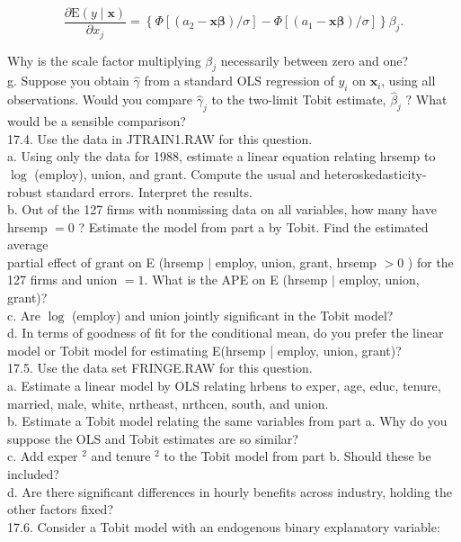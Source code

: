 \documentclass[10pt]{article}
\begin{document}
$$
\frac{\partial \mathrm{E}(y \mid \mathbf{x})}{\partial x_{j}}=\left\{\Phi\left[\left(a_{2}-\mathbf{x} \boldsymbol{\beta}\right) / \sigma\right]-\Phi\left[\left(a_{1}-\mathbf{x} \boldsymbol{\beta}\right) / \sigma\right]\right\} \beta_{j} .
$$

Why is the scale factor multiplying $\beta_{j}$ necessarily between zero and one?\\
g. Suppose you obtain $\hat{\gamma}$ from a standard OLS regression of $y_{i}$ on $\mathbf{x}_{i}$, using all observations. Would you compare $\hat{\gamma}_{j}$ to the two-limit Tobit estimate, $\hat{\beta}_{j}$ ? What would be a sensible comparison?\\
17.4. Use the data in JTRAIN1.RAW for this question.\\
a. Using only the data for 1988, estimate a linear equation relating hrsemp to $\log$ (employ), union, and grant. Compute the usual and heteroskedasticity-robust standard errors. Interpret the results.\\
b. Out of the 127 firms with nonmissing data on all variables, how many have hrsemp $=0$ ? Estimate the model from part a by Tobit. Find the estimated average\\
partial effect of grant on E (hrsemp $\mid$ employ, union, grant, hrsemp $>0$ ) for the 127 firms and union $=1$. What is the APE on E (hrsemp $\mid$ employ, union, grant)?\\
c. Are $\log$ (employ) and union jointly significant in the Tobit model?\\
d. In terms of goodness of fit for the conditional mean, do you prefer the linear model or Tobit model for estimating E(hrsemp | employ, union, grant)?\\
17.5. Use the data set FRINGE.RAW for this question.\\
a. Estimate a linear model by OLS relating hrbens to exper, age, educ, tenure, married, male, white, nrtheast, nrthcen, south, and union.\\
b. Estimate a Tobit model relating the same variables from part a. Why do you suppose the OLS and Tobit estimates are so similar?\\
c. Add exper ${ }^{2}$ and tenure ${ }^{2}$ to the Tobit model from part b. Should these be included?\\
d. Are there significant differences in hourly benefits across industry, holding the other factors fixed?\\
17.6. Consider a Tobit model with an endogenous binary explanatory variable:\\
\end{document}
